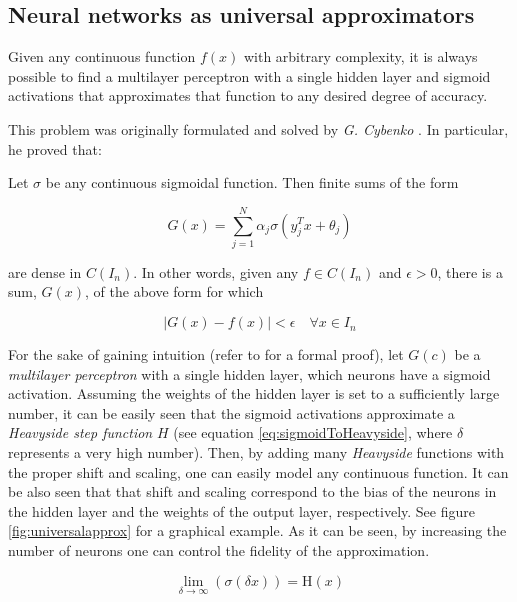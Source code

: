 \subsection{Neural networks as universal approximators}
Given any continuous function $f(x)$ with arbitrary complexity, it is always possible to find a multilayer perceptron with a single hidden layer and sigmoid activations that approximates that function to any desired degree of accuracy.

This problem was originally formulated and solved by \textit{G. Cybenko} \autocite{Cybenko1989}. In particular, he proved that:

\begin{thm}[ 2 - Cybenko, 1989]
	Let $\sigma$ be any continuous sigmoidal function. Then finite sums of the form

	$$ G(x) = \sum_{j=1}^{N} \alpha_j \sigma(y_j^Tx + \theta_j) $$

	are dense in $C(I_n)$. In other words, given any $f \in C(I_n)$ and $\epsilon > 0$, there is a sum, $G(x)$, of the above form for which

	$$|G(x) - f(x)| < \epsilon \quad \forall x \in I_n$$
\end{thm}

For the sake of gaining intuition (refer to \autocite{Cybenko1989} for a formal proof), let $G(c)$ be a \textit{multilayer perceptron} with a single hidden layer, which neurons have a sigmoid activation. Assuming the weights of the hidden layer is set to a sufficiently large number, it can be easily seen that the sigmoid activations approximate a \textit{Heavyside step function} $H$ (see equation \ref{eq:sigmoidToHeavyside}, where $\delta$ represents a very high number). Then, by adding many \textit{Heavyside} functions with the proper shift and scaling, one can easily model any continuous function. It can be also seen that that shift and scaling correspond to the bias of the neurons in the hidden layer and the weights of the output layer, respectively. See figure \ref{fig:universalapprox} for a graphical example. As it can be seen, by increasing the number of neurons one can control the fidelity of the approximation.


\begin{equation}
	\label{eq:sigmoidToHeavyside}
	\lim_{\delta \rightarrow \infty} (\sigma(\delta x)) = \mathrm{H}(x)
\end{equation}

